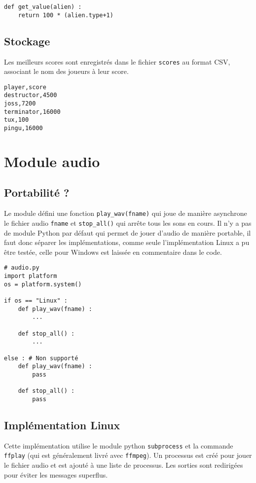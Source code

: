 \documentclass[12pt]{article}
\newcommand{\pagesection}{\newpage\section}
\begin{document}
\begin{verbatim}
def get_value(alien) :
	return 100 * (alien.type+1) 
\end{verbatim}


\subsection{Stockage}
	Les meilleurs scores sont enregistrés dans le fichier \texttt{scores} au format CSV, associant le nom des joueurs à leur score.

\begin{verbatim}
player,score
destructor,4500
joss,7200
terminator,16000
tux,100
pingu,16000
\end{verbatim}




\pagesection{Module audio}

\subsection{Portabilité ?}

Le module défini une fonction \texttt{play\_wav(fname)} qui joue de manière asynchrone le fichier audio \texttt{fname} et \texttt{stop\_all()} qui arrête tous les sons en cours. Il n'y a pas de module Python par défaut qui permet de jouer d'audio de manière portable, il faut donc séparer les implémentations, comme seule l'implémentation Linux a pu être testée, celle pour Windows est laissée en commentaire dans le code.

\begin{verbatim}
# audio.py
import platform
os = platform.system() 

if os == "Linux" :
	def play_wav(fname) :
		...

	def stop_all() :
		...

else : # Non supporté
	def play_wav(fname) :
		pass

	def stop_all() :
		pass
\end{verbatim}

\subsection{Implémentation Linux}

Cette implémentation utilise le module python \texttt{subprocess} et la commande \texttt{ffplay} (qui est généralement livré avec \texttt{ffmpeg}). Un processus est créé pour jouer le fichier audio et est ajouté à une liste de processus. Les sorties sont redirigées pour éviter les messages superflus. 
\end{document}
